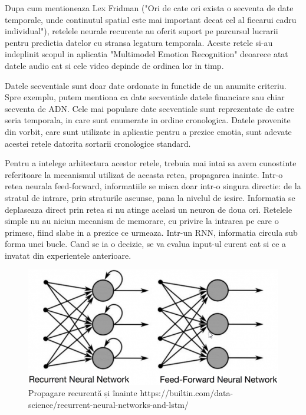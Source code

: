 \documentclass[a4paper, 12pt]{report}
\begin{document}
	Dupa cum mentioneaza Lex Fridman ("Ori de cate ori exista o secventa de date temporale, unde continutul spatial este mai important decat cel al fiecarui cadru individual"), retelele neurale recurente au oferit suport pe parcursul lucrarii pentru predictia datelor cu stransa legatura temporala. Aceste retele si-au indeplinit scopul in aplicatia "Multimodel Emotion Recognition" deoarece atat datele audio cat si cele video depinde de ordinea lor in timp.
	
	Datele secventiale sunt doar date ordonate in functide de un anumite criteriu. Spre exemplu, putem mentiona ca date secventiale datele financiare sau chiar secventa de ADN. Cele mai populare date secventiale sunt reprezentate de catre seria temporala, in care sunt enumerate in ordine cronologica. Datele provenite din vorbit, care sunt utilizate in aplicatie pentru a prezice emotia, sunt adevate acestei retele datorita sortarii cronologice standard.
	
	Pentru a intelege arhitectura acestor retele, trebuia mai intai sa avem cunostinte referitoare la mecanismul utilizat de aceasta retea, propagarea inainte. Intr-o retea neurala feed-forward, informatiile se misca doar intr-o singura directie: de la stratul de intrare, prin straturile ascunse, pana la nivelul de iesire. Informatia se deplaseaza direct prin retea si nu atinge acelasi un neuron de doua ori. Retelele simple nu au niciun mecanism de memorare, cu privire la intrarea pe care o primesc, fiind slabe in a prezice ce urmeaza. Intr-un RNN, informatia circula sub forma unei bucle. Cand se ia o decizie, se va evalua input-ul curent cat si ce a invatat din experientele anterioare.
	
	\begin{figure}[H]
		\begin{center}
			\includegraphics[scale=0.47]{images/fwd_recc.png}
		\end{center}
		\caption{Propagare recurentă și înainte\newline
			\hspace{\linewidth}https://builtin.com/data-science/recurrent-neural-networks-and-lstm/}
		\label{fig:fwd_recc}
	\end{figure} 
\end{document}
